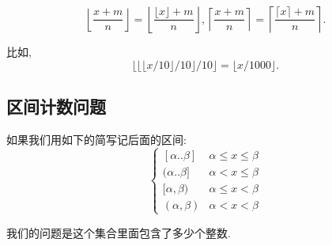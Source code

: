 \documentclass{ctexart}
\begin{document}
\begin{corollary}
    $$
\left\lfloor\frac{x+m}{n}\right\rfloor=\left\lfloor\frac{\lfloor x\rfloor+m}{n}\right\rfloor,\left\lceil\frac{x+m}{n}\right\rceil=\left\lceil\frac{\lceil x\rceil+m}{n}\right\rceil .
$$
    
\end{corollary}

比如, $$
\lfloor\lfloor\lfloor x / 10\rfloor / 10\rfloor / 10\rfloor=\lfloor x / 1000\rfloor .
$$

\subsection{区间计数问题} 

如果我们用如下的简写记后面的区间:
$$
\begin{cases}
    [\alpha..\beta] & \alpha \leqslant x \leqslant \beta\\
    (\alpha..\beta]& \alpha<x \leqslant \beta \\
    [\alpha,\beta) & \alpha \leq x<\beta\\
    (\alpha,\beta)& \alpha<x<\beta
\end{cases}$$

我们的问题是这个集合里面包含了多少个整数. 
\end{document}
